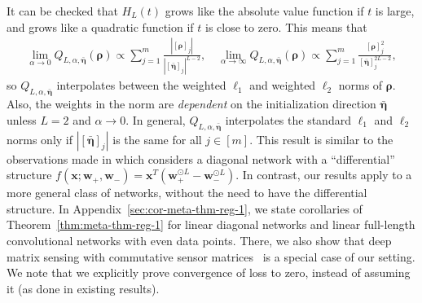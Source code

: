 \documentclass{article} %
\def\vw{{\bm{w}}}
\def\vx{{\bm{x}}}
\newcommand{\vrho}{{\bm{\rho}}}
\newcommand{\veta}{{\bm{\eta}}}
\begin{document}
\begin{remark}
It can be checked that $H_L(t)$ grows like the absolute value function if $t$ is large, and grows like a quadratic function if $t$ is close to zero. This means that 
\begin{align*}
    \lim_{\alpha \to 0} Q_{L, \alpha, \bar \veta}(\vrho) \propto \sum\nolimits_{j=1}^m \tfrac{|[\vrho]_j|}{|[\bar \veta]_j|^{L-2}},\quad
    \lim_{\alpha \to \infty} Q_{L, \alpha, \bar \veta}(\vrho) \propto \sum\nolimits_{j=1}^m \tfrac{[\vrho]_j^2}{[\bar \veta]_j^{2L-2}},
\end{align*}
so $Q_{L, \alpha, \bar \veta}$ interpolates between the weighted $\ell_1$ and weighted $\ell_2$ norms of $\vrho$. Also, the weights in the norm are \emph{dependent} on the initialization direction $\bar \veta$ unless $L=2$ and $\alpha \to 0$. In general, $Q_{L, \alpha, \bar \veta}$ interpolates the standard $\ell_1$ and $\ell_2$ norms only if $|[\bar \veta]_j|$ is the same for all $j \in [m]$. 
This result is similar to the observations made in \citet{woodworth2020kernel} which considers a diagonal network with a ``differential'' structure $f(\vx;\vw_+,\vw_-) = \vx^T(\vw_+^{\odot L}-\vw_-^{\odot L})$. In contrast, our results apply to a more general class of networks, without the need to have the differential structure. In Appendix~\ref{sec:cor-meta-thm-reg-1}, we state corollaries of Theorem~\ref{thm:meta-thm-reg-1} for linear diagonal networks and linear full-length convolutional networks with even data points. There, we also show that deep matrix sensing with commutative sensor matrices~\citep{arora2019implicit} is a special case of our setting. We note that we explicitly prove convergence of loss to zero, instead of assuming it (as done in existing results).
\end{remark}
\end{document}
